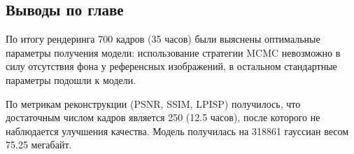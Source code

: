 \subsection{Выводы по главе}

По итогу рендеринга 700 кадров (35 часов) были выяснены оптимальные параметры получения модели: использование стратегии MCMC невозможно в силу отсутствия фона у референсных изображений, в остальном стандартные параметры подошли к модели.

По метрикам реконструкции (PSNR, SSIM, LPISP) получилось, что достаточным числом кадров является 250 (12.5 часов), после которого не наблюдается улучшения качества. Модель получилась на 318861 гауссиан весом 75.25 мегабайт.